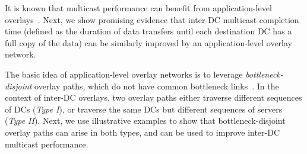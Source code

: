 It is known that multicast performance can
benefit from application-level overlays~\cite{chu2000case}.
Next, we show promising evidence that inter-DC multicast
completion time (defined as the duration of data transfers
until each destination DC has a full copy of the data)
can be similarly improved by an
application-level overlay network.

The basic idea of application-level overlay networks is
to leverage {\em bottleneck-disjoint} overlay paths, which do
not have common bottleneck links~\cite{datta19951}.
In the context of inter-DC overlays, two
overlay paths either traverse different sequences of DCs ({\em Type I}), or
traverse the same DCs but different sequences of
servers ({\em Type II}).
Next, we use illustrative examples to show that
bottleneck-disjoint overlay paths can arise in both types, and
can be used to improve inter-DC multicast performance.

